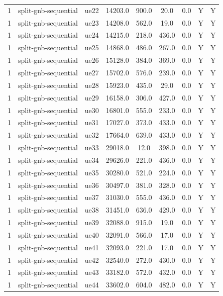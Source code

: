 \begin{table}[ht]
\begin{tabular}{|c|c|c|c|c|c|c|c|c|}
1 & split-gnb-sequential & ue22 & 14203.0 & 900.0 & 20.0 & 0.0 & Y & Y \\
1 & split-gnb-sequential & ue23 & 14208.0 & 562.0 & 19.0 & 0.0 & Y & Y \\
1 & split-gnb-sequential & ue24 & 14215.0 & 218.0 & 436.0 & 0.0 & Y & Y \\
1 & split-gnb-sequential & ue25 & 14868.0 & 486.0 & 267.0 & 0.0 & Y & Y \\
1 & split-gnb-sequential & ue26 & 15128.0 & 384.0 & 369.0 & 0.0 & Y & Y \\
1 & split-gnb-sequential & ue27 & 15702.0 & 576.0 & 239.0 & 0.0 & Y & Y \\
1 & split-gnb-sequential & ue28 & 15923.0 & 435.0 & 29.0 & 0.0 & Y & Y \\
1 & split-gnb-sequential & ue29 & 16158.0 & 306.0 & 427.0 & 0.0 & Y & Y \\
1 & split-gnb-sequential & ue30 & 16801.0 & 555.0 & 233.0 & 0.0 & Y & Y \\
1 & split-gnb-sequential & ue31 & 17027.0 & 373.0 & 433.0 & 0.0 & Y & Y \\
1 & split-gnb-sequential & ue32 & 17664.0 & 639.0 & 433.0 & 0.0 & Y & Y \\
1 & split-gnb-sequential & ue33 & 29018.0 & 12.0 & 398.0 & 0.0 & Y & Y \\
1 & split-gnb-sequential & ue34 & 29626.0 & 221.0 & 436.0 & 0.0 & Y & Y \\
1 & split-gnb-sequential & ue35 & 30280.0 & 521.0 & 224.0 & 0.0 & Y & Y \\
1 & split-gnb-sequential & ue36 & 30497.0 & 381.0 & 328.0 & 0.0 & Y & Y \\
1 & split-gnb-sequential & ue37 & 31030.0 & 555.0 & 436.0 & 0.0 & Y & Y \\
1 & split-gnb-sequential & ue38 & 31451.0 & 636.0 & 429.0 & 0.0 & Y & Y \\
1 & split-gnb-sequential & ue39 & 32088.0 & 915.0 & 19.0 & 0.0 & Y & Y \\
1 & split-gnb-sequential & ue40 & 32091.0 & 566.0 & 17.0 & 0.0 & Y & Y \\
1 & split-gnb-sequential & ue41 & 32093.0 & 221.0 & 17.0 & 0.0 & Y & Y \\
1 & split-gnb-sequential & ue42 & 32540.0 & 272.0 & 430.0 & 0.0 & Y & Y \\
1 & split-gnb-sequential & ue43 & 33182.0 & 572.0 & 432.0 & 0.0 & Y & Y \\
1 & split-gnb-sequential & ue44 & 33602.0 & 604.0 & 482.0 & 0.0 & Y & Y \\

\end{tabular}
\end{table}
